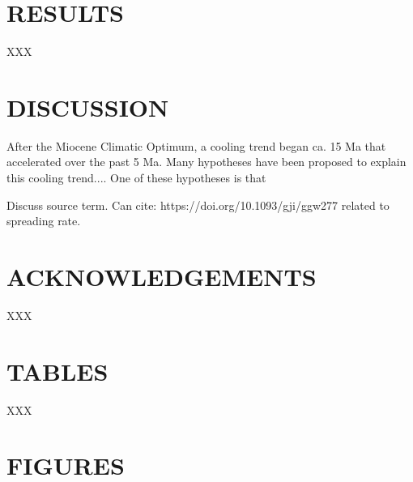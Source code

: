 \documentclass[11pt,letterpaper]{article}
\begin{document}
\section*{RESULTS}

XXX

\section*{DISCUSSION}

After the Miocene Climatic Optimum, a cooling trend began ca. 15 Ma that accelerated over the past 5 Ma. Many hypotheses have been proposed to explain this cooling trend.... One of these hypotheses is that 

Discuss source term. Can cite: https://doi.org/10.1093/gji/ggw277 related to spreading rate.

\section*{ACKNOWLEDGEMENTS \label{sec:ACKNOWLEDGEMENTS}}

XXX

\clearpage
\newpage

\section*{TABLES}

XXX

\clearpage
\newpage

\section*{FIGURES}
\end{document}
